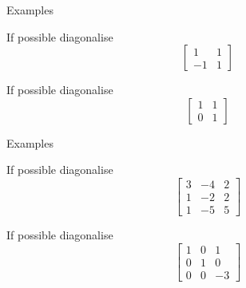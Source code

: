 \documentclass{beamer}
\begin{document}
\begin{frame}{Examples}
\begin{example}
If possible diagonalise
\begin{equation*}
\left[
\begin{matrix}
1&1\\
-1&1
\end{matrix}
\right]
\end{equation*}
\end{example}
\begin{example}
If possible diagonalise
\begin{equation*}
\left[
\begin{matrix}
1&1\\
0&1
\end{matrix}
\right]
\end{equation*}
\end{example}
\end{frame}

\begin{frame}{Examples}
\begin{example}
If possible diagonalise
\[
\left[
\begin{matrix}
3&-4&2\\
1&-2&2\\
1&-5&5
\end{matrix}
\right]\]
\end{example}
\begin{example}
If possible diagonalise
\[
\left[
\begin{matrix}
1&0&1\\
0&1&0\\
0&0&-3
\end{matrix}
\right]\]
\end{example}
\end{frame}
\end{document}
